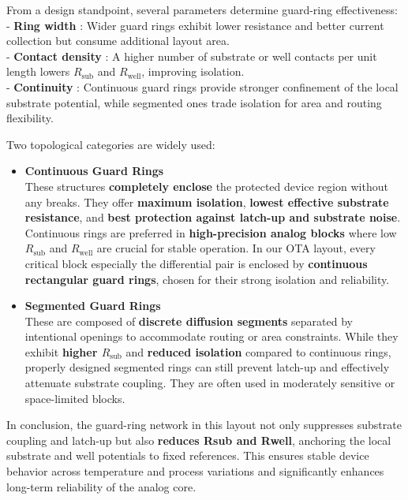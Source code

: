 \documentclass[
  11pt,
  a4paper,
  oneside]{scrbook}
\begin{document}
From a design standpoint, several parameters determine guard-ring
effectiveness:\\
- \textbf{Ring width} : Wider guard rings exhibit lower resistance and
better current collection but consume additional layout area.\\
- \textbf{Contact density} : A higher number of substrate or well
contacts per unit length lowers \(R_{\text{sub}}\) and
\(R_{\text{well}}\), improving isolation.\\
- \textbf{Continuity} : Continuous guard rings provide stronger
confinement of the local substrate potential, while segmented ones trade
isolation for area and routing flexibility.

Two topological categories are widely used:

\begin{itemize}
\item
  \textbf{Continuous Guard Rings}\\
  These structures \textbf{completely enclose} the protected device
  region without any breaks. They offer \textbf{maximum isolation},
  \textbf{lowest effective substrate resistance}, and \textbf{best
  protection against latch-up and substrate noise}.\\
  Continuous rings are preferred in \textbf{high-precision analog
  blocks} where low \(R_{\text{sub}}\) and \(R_{\text{well}}\) are
  crucial for stable operation. In our OTA layout, every critical block
  especially the differential pair is enclosed by \textbf{continuous
  rectangular guard rings}, chosen for their strong isolation and
  reliability.
\item
  \textbf{Segmented Guard Rings}\\
  These are composed of \textbf{discrete diffusion segments} separated
  by intentional openings to accommodate routing or area constraints.
  While they exhibit \textbf{higher \(R_{\text{sub}}\)} and
  \textbf{reduced isolation} compared to continuous rings, properly
  designed segmented rings can still prevent latch-up and effectively
  attenuate substrate coupling. They are often used in moderately
  sensitive or space-limited blocks.
\end{itemize}

In conclusion, the guard-ring network in this layout not only suppresses
substrate coupling and latch-up but also \textbf{reduces Rsub and
Rwell}, anchoring the local substrate and well potentials to fixed
references. This ensures stable device behavior across temperature and
process variations and significantly enhances long-term reliability of
the analog core.
\end{document}
